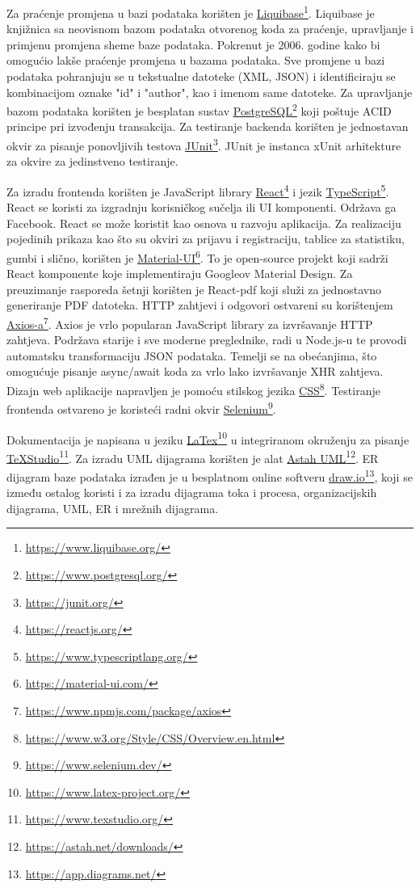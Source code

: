Za praćenje promjena u bazi podataka korišten je \underline{Liquibase}\footnote{\url{https://www.liquibase.org/}}. Liquibase je knjižnica sa neovisnom bazom podataka otvorenog koda za praćenje, upravljanje i primjenu promjena sheme baze podataka. Pokrenut je 2006. godine kako bi omogućio lakše praćenje promjena u bazama podataka. Sve promjene u bazi podataka pohranjuju se u tekstualne datoteke (XML, JSON) i identificiraju se kombinacijom oznake "id" i "author", kao i imenom same datoteke. Za upravljanje bazom podataka korišten je besplatan sustav \underline{PostgreSQL}\footnote{\url{https://www.postgresql.org/}} koji poštuje ACID principe pri izvođenju transakcija. Za testiranje backenda korišten je jednostavan okvir za pisanje ponovljivih testova \underline{JUnit}\footnote{\url{https://junit.org/}}. JUnit je instanca xUnit arhitekture za okvire za jedinstveno testiranje. \par
Za izradu frontenda korišten je JavaScript library \underline{React}\footnote{\url{https://reactjs.org/}} i jezik \underline{TypeScript}\footnote{\url{https://www.typescriptlang.org/}}. React se koristi za izgradnju korisničkog sučelja ili UI komponenti. Održava ga Facebook. React se može koristit kao osnova u razvoju aplikacija. Za realizaciju pojedinih prikaza kao što su okviri za prijavu i registraciju, tablice za statistiku, gumbi i slično, korišten je \underline{Material-UI}\footnote{\url{https://material-ui.com/}}. To je open-source projekt koji sadrži React komponente koje implementiraju Googleov Material Design. Za preuzimanje rasporeda šetnji korišten je React-pdf koji služi za jednostavno generiranje PDF datoteka. HTTP zahtjevi i odgovori ostvareni su korištenjem \underline{Axios-a}\footnote{\url{https://www.npmjs.com/package/axios}}. Axios je vrlo popularan JavaScript library za izvršavanje HTTP zahtjeva. Podržava starije i sve moderne preglednike, radi u Node.js-u te provodi automatsku transformaciju JSON podataka. Temelji se na obećanjima, što omogućuje pisanje async/await koda za vrlo lako izvršavanje XHR zahtjeva. Dizajn web aplikacije napravljen je pomoću stilskog jezika \underline{CSS}\footnote{\url{https://www.w3.org/Style/CSS/Overview.en.html}}. Testiranje frontenda ostvareno je koristeći radni okvir \underline{Selenium}\footnote{\url{https://www.selenium.dev/}}. \par
Dokumentacija je napisana u jeziku \underline{LaTex}\footnote{\url{https://www.latex-project.org/}} u integriranom okruženju za pisanje \underline{TeXStudio}\footnote{\url{https://www.texstudio.org/}}. Za izradu UML dijagrama korišten je alat \underline{Astah UML}\footnote{\url{https://astah.net/downloads/}}. ER dijagram baze podataka izrađen je u besplatnom online softveru \underline{draw.io}\footnote{\url{https://app.diagrams.net/}}, koji se između ostalog koristi i za izradu dijagrama toka i procesa, organizacijskih dijagrama, UML, ER i mrežnih dijagrama.



